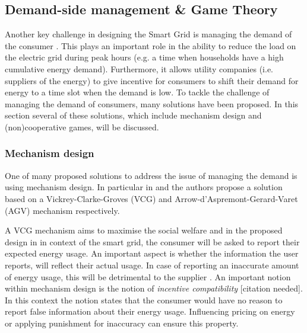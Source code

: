 \subsection{Demand-side management \& Game Theory}
Another key challenge in designing the Smart Grid is managing the demand of the consumer \cite{keypaper}. This plays an important role in the ability to reduce the load on the electric grid during peak hours (e.g. a time when households have a high cumulative energy demand). Furthermore, it allows utility companies (i.e. suppliers of the energy) to give incentive for consumers to shift their demand for energy to a time slot when the demand is low.  To tackle the challenge of managing the demand of consumers, many solutions have been proposed. In this section several of these solutions, which include mechanism design and (non)cooperative games, will be discussed. 

\subsubsection{Mechanism design}
One of many proposed solutions to address the issue of managing the demand is using mechanism design. In particular in \cite{SamadiMohsenian-RadSchoberEtAl2012} and \cite{MaDengSongEtAl2014} the authors propose a solution based on a Vickrey-Clarke-Groves (VCG) and Arrow-d'Aspremont-Gerard-Varet (AGV) mechanism respectively.

A VCG mechanism aims to maximise the social welfare \cite{ShohamLeyton-Brown2008} and in the proposed design in \cite{SamadiMohsenian-RadSchoberEtAl2012} in context of the smart grid, the consumer will be asked to report their expected energy usage. An important aspect is whether the information the user reports, will reflect their actual usage. In case of reporting an inaccurate amount of energy usage, this will be detrimental to the supplier \cite{MaDengSongEtAl2014}. An important notion within mechanism design is the notion of \textit{incentive compatibility} [citation needed]. In this context the notion states that the consumer would have no reason to report false information about their energy usage. Influencing pricing on energy \cite{SamadiMohsenian-RadSchoberEtAl2012} or applying punishment for inaccuracy \cite{MaDengSongEtAl2014} can ensure this property.

